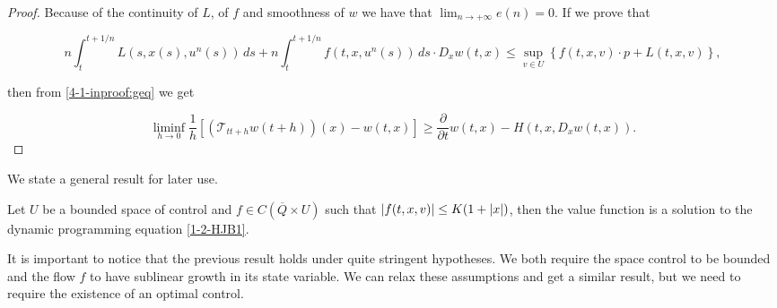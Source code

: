 \begin{proof}
    Because of the continuity of $L$, of $f$ and smoothness of $w$ we have that $\lim_{n\to+\infty}e(n)=0$. If we prove that

    \begin{equation}\label{miao}
        n\int_t^{t+1/n} L(s,x(s),u^n(s))\,ds + n\int_t^{t+1/n} f(t,x,u^n(s))\,ds \cdot D_x w(t,x) \leq \sup_{v\in U}\left\{f(t,x,v)\cdot p + L(t,x,v)\right\},
    \end{equation}  

    then from \ref{4-1-inproof:geq} we get

    \[\liminf_{h\to0}\frac{1}{h}\left[\left(\mathcal{T}_{tt+h}w\left(t+h\right)\right)(x) - w(t,x)\right] \geq \frac{\partial}{\partial t}w(t,x) - H(t,x,D_x w(t,x)).\]
 
    \color{black}{}
\end{proof}

We state a general result for later use.

\begin{corollary}\label{3-4-Coroll: Continuous V implies solution}
    Let $U$ be a bounded space of control and $f\in C(\overline{Q}\times U)$ such that $\abs{f(t,x,v)}\leq K(1+\abs{x})$, then the value 
    function is a solution to the dynamic programming equation \ref{1-2-HJB1}.
\end{corollary}

It is important to notice that the previous result holds under quite stringent hypotheses. We both require the space control to be bounded and the flow $f$ to have sublinear growth in its state variable. We can relax these assumptions 
and get a similar result, but we need to require the existence of an optimal control.

